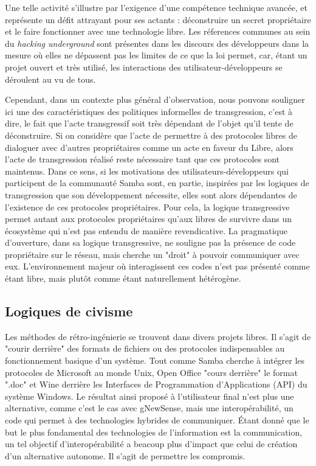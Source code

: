 Une telle activité s'illustre par l'exigence d'une compétence technique avancée, et représente un défit attrayant pour ses actants : déconstruire un secret propriétaire et le faire fonctionner avec une technologie libre. Les réferences communes au sein du \emph{hacking underground} sont présentes dans les discours des développeurs dans la mesure où elles ne dépassent pas les limites de ce que la loi permet, car, étant un projet ouvert et très utilisé, les interactions des utilisateur-développeurs se déroulent au vu de tous.

Cependant, dans un contexte plus général d'observation, nous pouvons souligner ici une des caractéristiques des politiques informelles de transgression, c'est à dire, le fait que l'acte transgressif soit très dépendant de l'objet qu'il tente de déconstruire. Si on considère que l'acte de permettre à des protocoles libres de dialoguer avec d'autres propriétaires comme un acte en faveur du Libre, alors l'acte de transgression réalisé reste nécessaire tant que ces protocoles sont maintenus. Dans ce sens, si les motivations des utilisateurs-développeurs qui participent de la communauté Samba sont, en partie, inspirées par les logiques de transgression que son développement nécessite, elles sont alors dépendantes de l'existence de ces protocoles propriétaires. Pour cela, la logique transgressive permet autant aux protocoles propriétaires qu'aux libres de survivre dans un écosystème qui n'est pas entendu de manière revendicative. La pragmatique d'ouverture, dans sa logique transgressive, ne souligne pas la présence de code propriétaire sur le réseau, mais cherche un "droit" à pouvoir communiquer avec eux. L'environnement majeur où interagissent ces codes n'est pas présenté comme étant libre, mais plutôt comme étant naturellement hétérogène.

\subsection{Logiques de civisme}\label{3.2.1}

Les méthodes de rétro-ingénierie se trouvent dans divers projets libres. Il s'agit de "courir derrière" des formats de fichiers ou des protocoles indispensables au fonctionnement basique d'un système. Tout comme Samba cherche à intégrer les protocoles de Microsoft au monde Unix, Open Office "cours derrière" le format ".doc" et Wine derrière les Interfaces de Programmation d'Applications (API) du système Windows. Le résultat ainsi proposé à l'utilisateur final n'est plus une alternative, comme c'est le cas avec gNewSense, mais une interopérabilité, un code qui permet à des technologies hybrides de communiquer. \'Etant donné que le but le plus fondamental des technologies de l'information est la communication, un tel objectif d'interopérabilité a beacoup plus d'impact que celui de création d'un alternative autonome. Il s'agit de permettre les compromis.

